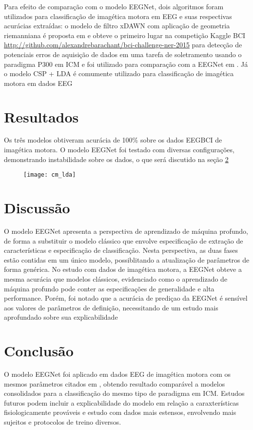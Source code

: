 \documentclass[conference,compsoc]{IEEEtran}
\begin{document}
Para efeito de comparação com o modelo EEGNet, dois algoritmos foram utilizados para classificação de imagética motora em EEG e suas respectivas acurácias extraídas: o modelo de filtro xDAWN com aplicação de geometria riemanniana é proposta em \cite{rivet2009xdawn} \cite{congedo2013new} e obteve o primeiro lugar na competição Kaggle BCI \url{http://github.com/alexandrebarachant/bci-challenge-ner-2015} para detecção de potenciais erros de aquisição de dados em uma tarefa de soletramento usando o paradigma P300 em ICM e foi utilizado para comparação com a EEGNet em \cite{lawhern2018eegnet}. Já o modelo CSP + LDA \cite{koles1991quantitative} é comumente utilizado para classificação de imagética motora em dados EEG

\section{Resultados}

Os três modelos obtiveram acurácia de 100\% sobre os dados EEGBCI de imagética motora. O modelo EEGNet foi testado com diversas configurações, demonstrando instabilidade sobre os dados, o que será discutido na seção \ref{discussion}

\begin{figure}[hbt!]
 \centering
 \texttt{[image: cm\_lda]}
\end{figure}

\section{Discussão} \label{discussion}
O modelo EEGNet apresenta a perspectiva de aprendizado de máquina profundo, de forma a substituir o modelo clássico que envolve especificação de extração de características e especificação de classificação. Nesta perspectiva, as duas fases estão contidas em um único modelo, possiblitando a atualização de parâmetros de forma genérica.
No estudo com dados de imagética motora, a EEGNet obteve a mesma acurácia que modelos clássicos, evidenciado como o aprendizado de máquina profundo pode conter as especificações de generalidade e alta performance. Porém, foi notado que a acurácia de prediçao da EEGNet é sensível aos valores de parâmetros de definição, necessitando de um estudo mais aprofundado sobre sua explicabilidade

\section{Conclusão}

O modelo EEGNet foi aplicado em dados EEG de imagética motora com os mesmos parâmetros citados em \cite{lawhern2018eegnet}, obtendo resultado comparável a modelos consolidados para a classificação do mesmo tipo de paradigma em ICM. Estudos futuros podem incluir a explicabilidade do modelo em relação a caraxterísticas fisiologicamente prováveis e estudo com dados mais estensos, envolvendo mais sujeitos e protocolos de treino diversos.


\end{document}
